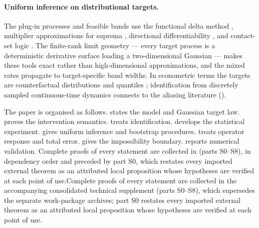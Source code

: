 \paragraph{Uniform inference on distributional targets.}
The plug-in processes and feasible bands use the functional delta method
\citep{vanDerVaart1998,vanDerVaartWellner1996}, multiplier approximations
for suprema \citep{ChernozhukovChetverikovKato2013}, directional
differentiability \citep{FangSantos2019}, and contact-set logic
\citep{AndrewsSoares2010,LintonSongWhang2010}. The finite-rank limit
geometry --- every target process is a deterministic derivative surface
loading a two-dimensional Gaussian --- makes these tools exact rather than
high-dimensional approximations, and the mixed rates propagate to
target-specific band widths. In econometric terms the targets are
counterfactual distributions and quantiles
\citep{ChernozhukovFernandezValMelly2013}; identification from discretely
sampled continuous-time dynamics connects to the aliasing literature
().

The paper is organised as follows.  states the model and Gaussian target law.  proves the intervention semantics.  treats identification.  develops the statistical experiment.  gives uniform inference and bootstrap procedures.  treats operator response and total error.  gives the impossibility boundary.  reports numerical validation. \ifdefined\MERGEDDOC Complete proofs of every statement are collected in  (parts S0--S8), in dependency order and preceded by part S0, which restates every imported external theorem as an attributed local proposition whose hypotheses are verified at each point of use.\else Complete proofs of every statement are collected in the accompanying consolidated technical supplement (parts S0--S8), which supersedes the separate work-package archives; part S0 restates every imported external theorem as an attributed local proposition whose hypotheses are verified at each point of use.\fi

